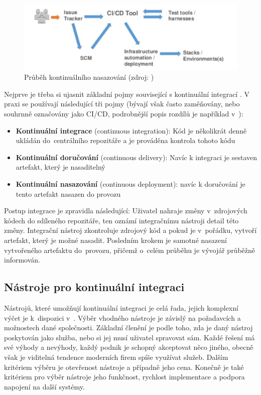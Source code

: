 \documentclass[FM,DP]{tulthesis}
\begin{document}
\begin{figure}[h]
\center
\includegraphics[width=\textwidth]{ci-cd-pipeline.png}
\caption{Průběh kontinuálního nasazování (zdroj: \cite{ci-cd-pipeline})}
\label{ci-cd-pipeline}
\end{figure}

Nejprve je třeba si ujasnit základní pojmy související s kontinuální integrací \cite{ci}. V praxi se používají 
následující tři pojmy (bývají však často zaměňovány, nebo souhrnně označovány jako CI/CD, podrobnější popis
rozdílů je například v~\cite{ci-cd}):

\begin{itemize}
\item \textbf{Kontinuální integrace} (continuous integration): Kód je několikrát denně ukládán 
do~centrálního repozitáře a je prováděna kontrola tohoto kódu
\item \textbf{Kontinuální doručování} (continuous delivery): Navíc k integraci je sestaven artefakt, 
který je nasaditelný
\item \textbf{Kontinuální nasazování} (continuous deployment): navíc k doručování je tento artefakt 
nasazen do provozu
\end{itemize}

Postup integrace je zpravidla následující: Uživatel nahraje změny v~zdrojových kódech do sdíleného repozitáře, 
ten oznámí integračnímu nástroji detail této změny. Integrační nástroj zkontroluje zdrojový kód a pokud je 
v~pořádku, vytvoří artefakt, který je možné nasadit. Posledním krokem je samotné nasazení vytvořeného artefaktu 
do~provozu, přičemž o~celém průběhu je vývojář průběžně informován.

\subsection{Nástroje pro kontinuální integraci}

Nástrojů, které umožňují kontinuální integraci je celá řada, jejich komplexní výčet je k~dispozici 
v~\cite[strana~139]{microservices}. Výběr vhodného nástroje je závislý na požadavcích a možnostech dané
společnosti. Základní členění je podle toho, zda je daný nástroj poskytován jako služba, nebo si jej
musí uživatel spravovat sám. Každé řešení má své výhody a nevýhody, každý podnik je schopný akceptovat
něco jiného, obecně však je viditelná tendence moderních firem spíše využívat služeb. Dalším kritériem
výběru je otevřenost nástroje a případně jeho cena. Konečně je také kritériem pro výběr nástroje jeho
funkčnost, rychlost implementace a podpora napojení na další systémy.
\end{document}
